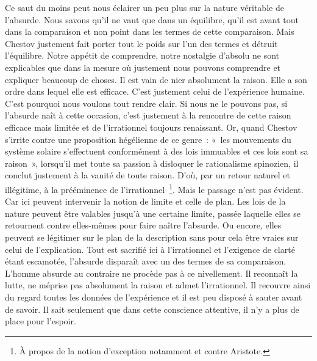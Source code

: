 \documentclass{book}
\begin{document}
Ce saut du moins peut nous éclairer un peu plus sur la nature véritable de l'absurde. Nous savons qu'il ne vaut que dans un équilibre, qu'il est avant tout dans la comparaison et non point dans les termes de cette comparaison. Mais Chestov justement fait porter tout le poids sur l'un des termes et détruit l'équilibre. Notre appétit de comprendre, notre nostalgie d'absolu ne sont explicables que dans la mesure où justement nous pouvons comprendre et expliquer beaucoup de choses. Il est vain de nier absolument la raison. Elle a son ordre dans lequel elle est efficace. C'est justement celui de l'expérience humaine. C'est pourquoi nous voulons tout rendre clair. Si nous ne le pouvons pas, si l'absurde naît à cette occasion, c'est justement à la rencontre de cette raison efficace mais limitée et de l'irrationnel toujours renaissant. Or, quand Chestov s'irrite contre une proposition hégélienne de ce genre : « les mouvements du système solaire s'effectuent conformément à des lois immuables et ces lois sont sa raison », lorsqu'il met toute sa passion à disloquer le rationalisme spinozien, il conclut justement à la vanité de toute raison. D'où, par un retour naturel et illégitime, à la prééminence de l'irrationnel \footnote{À propos de la notion d’exception notamment et contre Aristote.}. Mais le passage n'est pas évident. Car ici peuvent intervenir la notion de limite et celle de plan. Les lois de la nature peuvent être valables jusqu'à une certaine limite, passée laquelle elles se retournent contre elles‑mêmes pour faire naître l'absurde. Ou encore, elles peuvent se légitimer sur le plan de la description sans pour cela être vraies sur celui de l'explication. Tout est sacrifié ici à l'irrationnel et l'exigence de clarté étant escamotée, l'absurde disparaît avec un des termes de sa comparaison. L'homme absurde au contraire ne procède pas à ce nivellement. Il reconnaît la lutte, ne méprise pas absolument la raison et admet l'irrationnel. Il recouvre ainsi du regard toutes les données de l'expérience et il est peu disposé à sauter avant de savoir. Il sait seulement que dans cette conscience attentive, il n'y a plus de place pour l'espoir.
\end{document}
